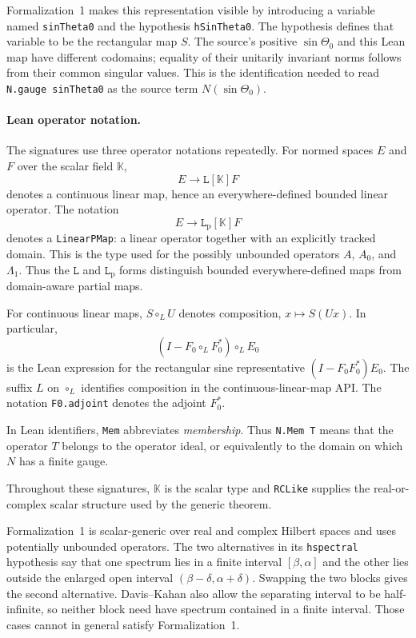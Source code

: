 Formalization~1 makes this representation visible by introducing a variable
named \texttt{sinTheta0} and the hypothesis \texttt{hSinTheta0}.  The hypothesis
defines that variable to be the rectangular map $S$.  The source's positive
$\sin\Theta_0$ and this Lean map have different codomains; equality of their
unitarily invariant norms follows from their common singular values.  This is
the identification needed to read \texttt{N.gauge sinTheta0} as the source term
$N(\sin\Theta_0)$.

\paragraph{Lean operator notation.}
The signatures use three operator notations repeatedly.  For normed spaces
$E$ and $F$ over the scalar field $\mathbb K$,
\[
  E\mathrel{\to}\!\mathtt{L}[\mathbb K]F
\]
denotes a continuous linear map, hence an everywhere-defined bounded linear
operator.  The notation
\[
  E\mathrel{\to}\!\mathtt{L}_{\mathrm p}[\mathbb K]F
\]
denotes a \texttt{LinearPMap}: a linear operator together with an explicitly
tracked domain.  This is the type used for the possibly unbounded operators
$A$, $A_0$, and $\Lambda_1$.  Thus the $\mathtt L$ and $\mathtt L_{\mathrm p}$
forms distinguish bounded everywhere-defined maps from domain-aware partial
maps.

For continuous linear maps, $S\mathbin{\circ_L}U$ denotes composition,
$x\mapsto S(Ux)$.  In particular,
\[
  (I-F_0\mathbin{\circ_L}F_0^*)\mathbin{\circ_L}E_0
\]
is the Lean expression for the rectangular sine representative
$(I-F_0F_0^*)E_0$.  The suffix $L$ on $\circ_L$ identifies composition in the
continuous-linear-map API.  The notation \texttt{F0.adjoint} denotes the
adjoint $F_0^*$.

In Lean identifiers, \texttt{Mem} abbreviates \emph{membership}. Thus
\texttt{N.Mem T} means that the operator $T$ belongs to the operator ideal, or
equivalently to the domain on which $N$ has a finite gauge.

Throughout these signatures, $\mathbb K$ is the scalar type and
\texttt{RCLike} supplies the real-or-complex scalar structure used by the
generic theorem.

Formalization~1 is scalar-generic over real and complex Hilbert spaces and
uses potentially unbounded operators.  The two alternatives in its
\texttt{hspectral} hypothesis say that one spectrum lies in a finite interval
$[\beta,\alpha]$ and the other lies
outside the enlarged open interval
$(\beta-\delta,\alpha+\delta)$.  Swapping the two blocks gives the second
alternative.  Davis--Kahan also allow the separating interval to be
half-infinite, so neither block need have spectrum contained in a finite
interval.  Those cases cannot in general satisfy Formalization~1.

